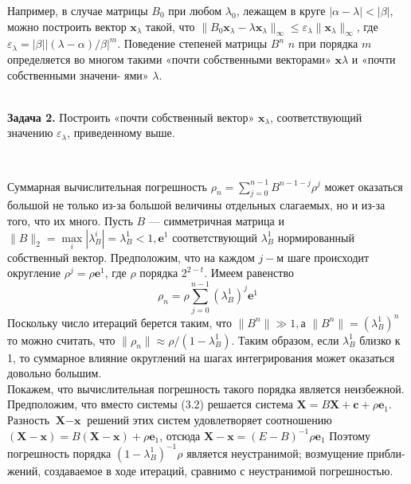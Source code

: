 \documentclass[a4paper, twoside, 12pt]{article}
\begin{document}
\begin{adjustwidth}{1cm}{0cm}

\begin{small}
Например, в случае матрицы $B_{0}$ при любом $\lambda_{0}$, лежащем в круге $\left|\alpha-\lambda\right|<\left|\beta\right|$,
можно построить вектор $\textbf{x}_{\lambda}$ такой, что $\|B_{0}\textbf{x}_{\lambda}-\lambda\textbf{x}_{\lambda}\|_{\infty}\leqslant \varepsilon_{\lambda}\|\textbf{x}_{\lambda}\|_{\infty}$, где $\varepsilon_{\lambda}=\left|\beta\right|\left|(\lambda-\alpha)/\beta\right|^{m}$.
Поведение степеней матрицы $B^{n}$ $n$ при порядка $m$ определяется во многом такими «почти собственными векторами» $\textbf{x}\lambda$ и «почти собственными значени- ями» $\lambda$. 
\end{small}
\end{adjustwidth}

\\
\noindent \textbf{Задача 2. } 
Построить «почти собственный вектор» $\textbf{x}_{\lambda}$, соответствующий значению $\varepsilon_{\lambda}$, приведенному выше.

\\ 

\begin{adjustwidth}{1cm}{0cm}
\begin{small}
Суммарная вычислительная погрешность $\rho_{n}=\sum\limits_{j=0}^{n-1}B^{n-1-j}\rho^{j}$ может оказаться
большой не только из-за большой величины отдельных слагаемых, но и из-за
того, что их много.
Пусть $B$ — симметричная матрица и$\|B\|_{2} = \max\limits_{i}\left|\lambda_{B}^{i}\right| = \lambda_{B}^{1} < 1, \textbf{e}^{1}$ соответствующий $\lambda_{B}^{1}$ нормированный собственный вектор. Предположим, что на
каждом $j-$м шаге происходит округление $\rho^{j} = \rho\textbf{e}^{1}$, где $\rho$ порядка $2^{2-t}$. Имеем равенство
\[
\rho_{n} = \rho\sum\limits_{j=0}^{n-1}(\lambda_{B}^{1})^{j}\textbf{e}^{1}
\]
\noindent
Поскольку число итераций берется таким, что $\|B^{n}\| \gg 1, $а $\|B^{n}\|=(\lambda_{B}^{1})^{n}$ то можно считать, что $\|\rho_{n}\| \approx \rho/(1-\lambda_{B}^{1})$. Таким образом, если $\lambda_{B}^{1}$ близко к 1, то суммарное влияние округлений на шагах интегрирования может оказаться довольно большим.
\\
Покажем, что вычислительная погрешность такого порядка является неизбежной. Предположим, что вместо системы (3.2) решается система $\textbf{X} = B\textbf{X} + \textbf{c} + \rho\textbf{e}_{1}$. Разность $\textbf{X} - \textbf{x}$ решений этих систем удовлетворяет соотношению $(\textbf{X} - \textbf{x}) = B(\textbf{X} - \textbf{x}) + \rho\textbf{e}_{1}$, отсюда $\textbf{X} - \textbf{x} = (E - B)^{-1}\rho\textbf{e}_{1}$ Поэтому погрешность порядка $(1 - \lambda_{B}^{1})^{-1}\rho$ является неустранимой; возмущение прибли- жений, создаваемое в ходе итераций, сравнимо с неустранимой погрешностью.
\end{small}
\end{adjustwidth}
\end{document}
